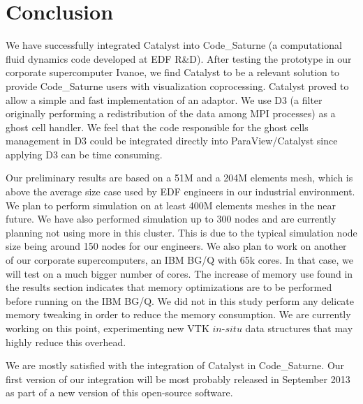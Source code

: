 \section{Conclusion}
\label{sec:conclusion}

We have successfully integrated Catalyst into Code\_Saturne (a computational
fluid dynamics code developed at EDF R\&D). After testing the prototype in our
corporate supercomputer Ivanoe, we find Catalyst to be a relevant solution to
provide Code\_Saturne users with visualization coprocessing.  Catalyst proved to allow a
simple and fast implementation of an adaptor. We use D3 (a filter originally 
performing a redistribution of the data among MPI processes) as a ghost cell
handler. We feel that the code responsible for the ghost cells management in D3
could be integrated directly into ParaView/Catalyst since applying D3 can be
time consuming.  

Our preliminary results are based on a 51M and a 204M elements mesh, which is above the
average size case used by EDF engineers in our industrial environment.  We plan
to perform simulation on at least 400M elements meshes in the near future.  
We have also
performed simulation up to 300 nodes and are currently planning not using more
in this cluster. This is due to the typical simulation node size
being around 150 nodes for our engineers.  We also plan to work on another of
our corporate supercomputers, an IBM BG/Q with 65k cores. In that case, we will
test on a much bigger number of cores.  The increase of memory use found in the
results section indicates that memory optimizations are to be performed before
running on the IBM BG/Q. We did not in this study perform any delicate memory
tweaking in order to reduce the memory consumption. We are currently working on
this point, experimenting new VTK $in$-$situ$ data structures that may highly
reduce this overhead.

We are mostly satisfied with the integration of Catalyst in Code\_Saturne.
Our first version of our integration will be most probably released in September 
2013 as part of a new version of this open-source software. 

